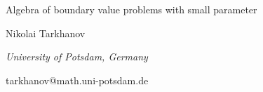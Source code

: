 \documentclass[10pt,a4paper]{article}
\begin{document}
\begin{center}

{\Large Algebra of boundary value problems with small parameter}

\bigskip

{\sc Nikolai Tarkhanov}

{\small\it University of Potsdam, Germany}

{\small \rm tarkhanov@math.uni-potsdam.de}





\end{center}

\bigskip

\end{document}
